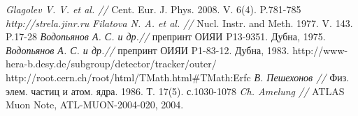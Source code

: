 \documentclass[a4paper,12pt]{article}
\begin{document}

\clearpage 

\begin{thebibliography}{99}
  \emph{Glagolev V. V. et al. //} Cent. Eur. J. Phys. 2008. V. 6(4). P.781-785
  \emph{http://strela.jinr.ru}
  \emph{Filatova N. A. et al. //} Nucl. Instr. and Meth. 1977. V. 143. P.17-28
  \emph{Водопьянов А. С. и др.//} препринт ОИЯИ P13-9351. Дубна, 1975.
  \emph{Водопьянов А. С. и др.//} препринт ОИЯИ P1-83-12. Дубна, 1983.
  http://www-hera-b.desy.de/subgroup/detector/tracker/outer/
  http://root.cern.ch/root/html/TMath.html\#TMath:Erfc
  \emph{В. Пешехонов //} Физ. элем. частиц и атом. ядра. 1986. Т. 17(5).
  с.1030-1078
  \emph{Ch. Amelung //} ATLAS Muon Note, ATL-MUON-2004-020, 2004.
\end{thebibliography}

\clearpage 
\clearpage 
\end{document}
